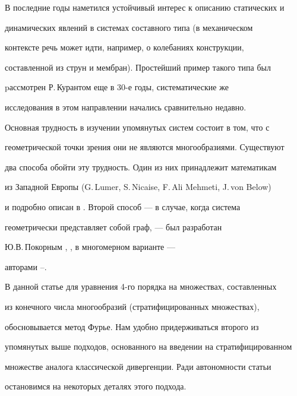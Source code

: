 \label{begin} 


 


 


В последние годы наметился устойчивый интерес к описанию статических и 


динамических явлений в системах составного типа (в механическом 


контексте речь может идти, например, о колебаниях конструкции, 


составленной из струн и мембран). Простейший пример такого типа был 


pассмотрен Р.\,Курантом \cite{1} еще в 30-е годы, систематические же 


исследования в этом направлении начались сравнительно недавно. 


 


Основная трудность в изучении упомянутых систем состоит в том, что с 


геометрической точки зрения они не являются многообразиями. Существуют 


два способа обойти эту трудность. Один из них принадлежит математикам 


из Западной Европы (G.\,Lumer, S.\,Nicaise, F.\,Ali Mehmeti, J.\,von Below)


и подробно описан в \cite{2}. Второй способ --- в случае, когда система 


геометрически представляет собой граф, --- был разработан 


Ю.В.\,Покорным \cite{3}, \cite{4}, в многомерном варианте ---


авторами \cite{5}--\cite{10}. 


 


В данной статье для уравнения 4-го порядка на множествах, составленных 


из конечного числа многообразий (стратифицированных множествах), 


обосновывается метод Фурье. Нам удобно придерживаться второго из 


упомянутых выше подходов, основанного на введении на стратифицированном 


множестве аналога классической дивергенции. Ради автономности статьи 


остановимся на некоторых деталях этого подхода. 


\medskip 


 


